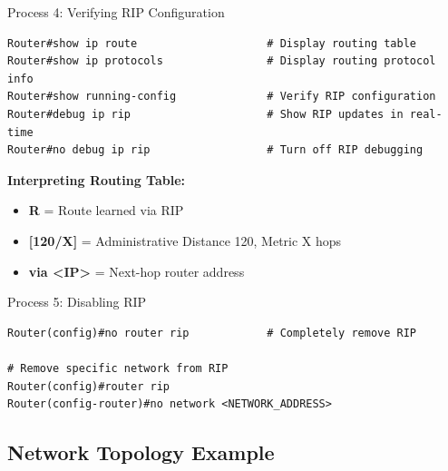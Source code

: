 \documentclass[12pt,a4paper]{article}
\begin{document}
\begin{commandbox}{Process 4: Verifying RIP Configuration}
\begin{lstlisting}
Router#show ip route                    # Display routing table
Router#show ip protocols                # Display routing protocol info
Router#show running-config              # Verify RIP configuration
Router#debug ip rip                     # Show RIP updates in real-time
Router#no debug ip rip                  # Turn off RIP debugging
\end{lstlisting}

\textbf{Interpreting Routing Table:}
\begin{itemize}[noitemsep]
    \item \textbf{R} = Route learned via RIP
    \item \textbf{[120/X]} = Administrative Distance 120, Metric X hops
    \item \textbf{via <IP>} = Next-hop router address
\end{itemize}
\end{commandbox}

\begin{commandbox}{Process 5: Disabling RIP}
\begin{lstlisting}
Router(config)#no router rip            # Completely remove RIP

# Remove specific network from RIP
Router(config)#router rip
Router(config-router)#no network <NETWORK_ADDRESS>
\end{lstlisting}
\end{commandbox}

\subsection{Network Topology Example}
\end{document}
